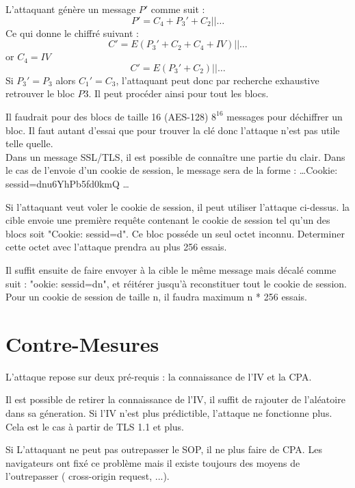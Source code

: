 L'attaquant génère un message $P'$ comme suit :
\[ P' = C_4 + P_3' + C_2 || \dots\]
Ce qui donne le chiffré suivant :
\[ C' = E(P_3' + C_2 + C_4 + IV) || \dots  \]
or $C_4 = IV$
\[ C' = E(P_3' + C_2) || \dots \]
Si $P_3' = P_3 $ alors $C_1' = C_3$, l'attaquant peut donc par recherche exhaustive retrouver le bloc $P3$. Il peut
procéder ainsi pour tout les blocs. 

Il faudrait pour des blocs de taille 16 (AES-128) $8^{16}$ messages pour déchiffrer un bloc. Il faut autant
d'essai que pour trouver la clé donc l'attaque n'est pas utile telle quelle.\\ 

Dans un message SSL/TLS, il est possible de connaître une partie du clair. Dans le cas de l'envoie d'un cookie de 
session, le message sera de la forme : \dots Cookie: sessid=dnu6YhPb5fd0kmQ \dots

Si l'attaquant veut voler le cookie de session, il peut utiliser l'attaque ci-dessus. la cible envoie une première
requête contenant le cookie de session tel qu'un des blocs soit "Cookie: sessid=d". Ce bloc posséde un seul octet
inconnu. Determiner cette octet avec l'attaque prendra au plus 256 essais.

Il suffit ensuite de faire envoyer à la cible le même message mais décalé comme suit : "ookie: sessid=dn", et
réitérer jusqu'à reconstituer tout le cookie de session. Pour un cookie de session de taille n, il faudra maximum
n * 256 essais.

\section{Contre-Mesures}
\label{sec:cmBeast}

   L'attaque repose sur deux pré-requis : la connaissance de l'IV et la CPA. 

Il est possible de retirer la connaissance de l'IV, il suffit de rajouter de l'aléatoire dans sa géneration. 
Si l'IV n'est plus prédictible, l'attaque ne fonctionne plus. Cela est le cas à partir de TLS 1.1 et plus.

Si L'attaquant ne peut pas outrepasser le SOP, il ne plus faire de CPA. Les navigateurs ont fixé ce problème mais
il existe toujours des moyens de l'outrepasser ( cross-origin request, ...). 



